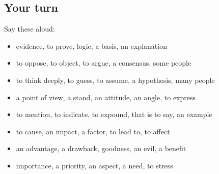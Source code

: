 \subsection*{Your turn}
Say these aloud:

\begin{itemize}
\raggedright
  \item evidence, to prove, logic, a basis, an explanation
  \item to oppose, to object, to argue, a consensus, some people
  \item to think deeply, to guess, to assume, a hypothesis, many people
  \item a point of view, a stand, an attitude, an angle, to express
  \item to mention, to indicate, to expound, that is to say, an example
  \item to cause, an impact, a factor, to lead to, to affect
  \item an advantage, a drawback, goodness, an evil, a benefit
  \item importance, a priority, an aspect, a need, to stress
\end{itemize}

